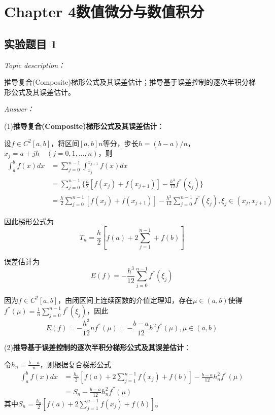 \documentclass[12pt]{ctexart}
\begin{document}
\newpage
	\section{Chapter 4\quad 数值微分与数值积分}
	\label{sec:4}	
	
	\subsection{实验题目 1}
	\textit{Topic description：}
	
	推导复合(Composite)梯形公式及其误差估计；推导基于误差控制的逐次半积分梯形公式及其误差估计。
	
	\textit{Answer：}
	
	(1)\textbf{推导复合(Composite)梯形公式及其误差估计}：
	
	设$f\in C^2[a,b]$，将区间$[a,b]n$等分，步长$h=(b-a)/n$，$x_j=a+jh\quad(j=0,1,\dots,n)$，则
	\begin{equation*}
	\begin{split}
	\int_a^bf(x)dx&=\sum_{j=0}^{n-1}\int_{x_j}^{x_{j+1}}f(x)dx \\
	&=\sum_{j=0}^{n-1}\{\frac{h}{2}[f(x_j)+f(x_{j+1})]-\frac{h^3}{12}f^{''}(\xi_j)\} \\
	&=\frac{h}{2}\sum_{j=0}^{n-1}[f(x_j)+f(x_{j+1})]-\frac{h^3}{12}\sum_{j=0}^{n-1}f^{''}(\xi_j),\xi_j\in (x_j,x_{j+1})
	\end{split}
	\end{equation*}
	
	因此梯形公式为
	\begin{equation*}
	T_n=\frac{h}{2}[f(a)+2\sum_{j=1}^{n-1}+f(b)]
	\end{equation*}
	
	误差估计为
	\begin{equation*}
	E(f)=-\frac{h^3}{12}\sum_{j=0}^{n-1}f^{''}(\xi_j)
	\end{equation*}
	
	因为$f\in C^2[a,b]$，由闭区间上连续函数的介值定理知，存在$\mu\in(a,b)$使得$f^{''}(\mu)=\frac{1}{n}\sum_{j=0}^{n-1}f^{''}(\xi_j)$，因此
	\begin{equation*}
	E(f)=-\frac{h^3}{12}nf^{''}(\mu)=-\frac{b-a}{12}h^2f^{''}(\mu),\mu\in(a,b)
	\end{equation*}
	
	(2)\textbf{推导基于误差控制的逐次半积分梯形公式及其误差估计}：
	
	令$h_n=\frac{b-a}{n}$，则根据复合梯形公式
	\begin{equation*}
	\begin{split}
	\int_a^bf(x)dx&=\frac{h_n}{2}[f(a)+2\sum_{j=1}^{n-1}f(x_j)+f(b)]-\frac{b-a}{12}h_n^2f^{''}(\mu) \\
	&=S_n-\frac{b-a}{12}h_n^2f^{''}(\mu)
	\end{split}
	\end{equation*}
	其中$S_n=\frac{h_n}{2}[f(a)+2\sum\limits_{j=1}^{n-1}f(x_j)+f(b)]$。
	
\end{document}
